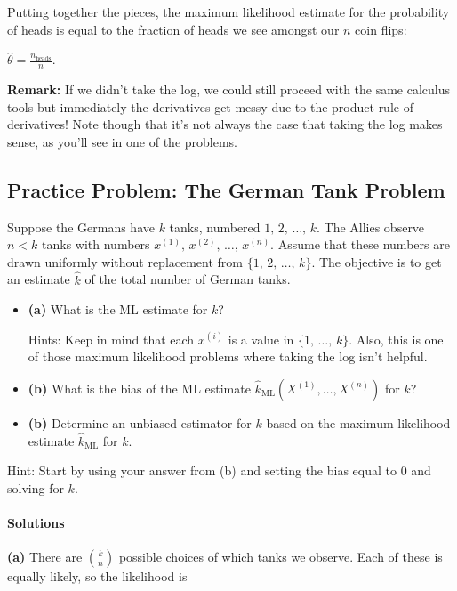 \documentclass[6008notes.tex]{subfiles}
\begin{document}
Putting together the pieces, the maximum likelihood estimate for the probability of heads is equal to the fraction of heads we see amongst our $n$ coin flips:

{\centering$\widehat{\theta }=\frac{n_{\text {heads}}}{n}.$ \par}
 
\textbf{Remark:} If we didn't take the log, we could still proceed with the same calculus tools but immediately the derivatives get messy due to the product rule of derivatives! Note though that it's not always the case that taking the log makes sense, as you'll see in one of the problems.


\subsection{Practice Problem: The German Tank Problem}

Suppose the Germans have $k$ tanks, numbered $1, \,  2, \,  \dots , \,  k$. The Allies observe $n<k$ tanks with numbers $x^{(1)}, \,  x^{(2)}, \,  \dots , \,  x^{(n)}$. Assume that these numbers are drawn uniformly without replacement from $\{ 1, \,  2, \,  \dots , \,  k \}$. The objective is to get an estimate $\widehat{k}$ of the total number of German tanks.

\begin{itemize}
\item \textbf{(a)} What is the ML estimate for $k$?

Hints: Keep in mind that each $x^{(i)}$ is a value in $\{ 1, \,  \dots , \,  k \}$. Also, this is one of those maximum likelihood problems where taking the log isn't helpful.

\item \textbf{(b)} What is the bias of the ML estimate $\widehat{k}_{\text {ML}}(X^{(1)},\dots ,X^{(n)})$ for $k$?

\item \textbf{(b)} Determine an unbiased estimator for $k$ based on the maximum likelihood estimate $\widehat{k}_{\text {ML}}$ for $k$.
\end{itemize}

Hint: Start by using your answer from (b) and setting the bias equal to 0 and solving for $k$.

\paragraph{Solutions}

\textbf{(a)} There are ${k \choose n}$ possible choices of which tanks we observe. Each of these is equally likely, so the likelihood is
\end{document}
